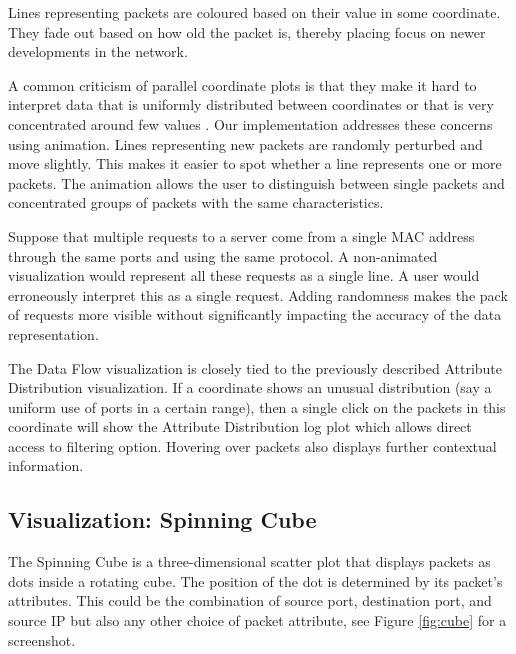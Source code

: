 Lines representing packets are coloured based on their value in some coordinate. They fade out based
on how old the packet is, thereby placing focus on newer developments in the network.

A common criticism of parallel coordinate plots is that they make it hard to interpret data that is
uniformly distributed between coordinates or that is very concentrated around few values
\cite{marty2009applied}. Our implementation addresses these concerns using animation. Lines
representing new packets are randomly perturbed and move slightly. This makes it easier to spot
whether a line represents one or more packets. The animation allows the user to distinguish between
single packets and concentrated groups of packets with the same characteristics.

Suppose that multiple requests to a server come from a single MAC address through the same ports and
using the same protocol. A non-animated visualization would represent all these requests as a single
line. A user would erroneously interpret this as a single request. Adding randomness makes the pack
of requests more visible without significantly impacting the accuracy of the data representation.

The Data Flow visualization is closely tied to the previously described Attribute Distribution
visualization. If a coordinate shows an unusual distribution (say a uniform use of ports in a
certain range), then a single click on the packets in this coordinate will show the Attribute
Distribution log plot which allows direct access to filtering option. Hovering over packets also
displays further contextual information.

\subsection{Visualization: Spinning Cube}
%
The Spinning Cube is a three-dimensional scatter plot that displays packets as dots inside a
rotating cube. The position of the dot is determined by its packet's attributes. This could be the
combination of source port, destination port, and source IP but also any other choice of packet
attribute, see Figure \ref{fig:cube} for a screenshot.

